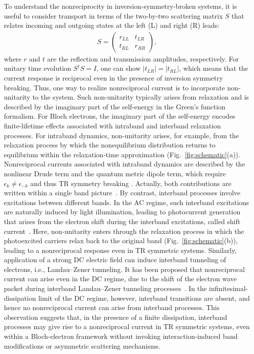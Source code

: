 \documentclass[twocolumn,superscriptaddress]{revtex4-1}
\begin{document}
To understand the nonreciprocity in inversion-symmetry-broken systems, it is useful to consider transport in terms of the two-by-two scattering matrix $S$ that relates incoming and outgoing states at the left (L) and right (R) leads:
\begin{align}   
  S=\left(
    \begin{array}{cc}
      r_{LL} & t_{LR} \\
      t_{RL} & r_{RR}
    \end{array}
  \right),
\end{align}
where $r$ and $t$ are the reflection and transmission amplitudes, respectively.
For unitary time evolution $S^\dagger S=I$, one can show $|t_{LR}|=|t_{RL}|$, which means that the current response is reciprocal even in the presence of inversion symmetry breaking.
Thus, one way to realize nonreciprocal current is to incorporate non-unitarity to the system.
Such non-unitarity typically arises from relaxation and is described by the imaginary part of the self-energy in the Green's function formalism.
For Bloch electrons, the imaginary part of the self-energy encodes finite-lifetime effects associated with intraband and interband relaxation processes.
For intraband dynamics, non-unitarity arises, for example, from the relaxation process by which the nonequilibrium distribution returns to equilibrium within the relaxation-time approximation (Fig.~\ref{fig:schematic}(a)).
Nonreciprocal currents associated with intraband dynamics are described by the nonlinear Drude term and the quantum metric dipole term, which require $\epsilon_{k}\neq \epsilon_{-k}$ and thus TR symmetry breaking \cite{Gao2014,Watanabe2020,Watanabe2021,Das2023,Kaplan2024,Ulrich2026,Guo2026}.
Actually, both contributions are written within a single band picture~\cite{Ulrich2026,Guo2026}.
By contrast, interband processes involve excitations between different bands.
In the AC regime, such interband excitations are naturally induced by light illumination, leading to photocurrent generation that arises from the electron shift during the interband excitations, called shift current~\cite{Sipe2000}.
Here, non-unitarity enters through the relaxation process in which the photoexcited carriers relax back to the original band (Fig.~\ref{fig:schematic}(b)), leading to a nonreciprocal response even in TR symmetric systems.
Similarly, application of a strong DC electric field can induce interband tunneling of electrons, i.e., Landau--Zener tunneling. 
It has been proposed that  nonreciprocal current can arise even in the DC regime, due to the shift of the electron wave packet during interband Landau--Zener tunneling processes~\cite{Kitamura2020,Kitamura2020PRB}.
In the infinitesimal-dissipation limit of the DC regime, however, interband transitions are absent, and hence no nonreciprocal current can arise from interband processes.
This observation suggests that, in the presence of a finite dissipation, interband processes may give rise to a nonreciprocal current in TR symmetric systems, even within a Bloch-electron framework without invoking interaction-induced band modifications or asymmetric scattering mechanisms.
\end{document}
